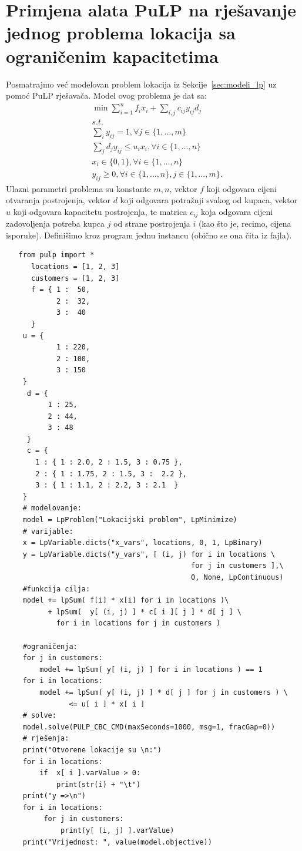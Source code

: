 \documentclass[a4paper, utf8, 11pt, colorlinks]{book}
\begin{document}
 \section{Primjena alata PuLP na rješavanje jednog problema lokacija sa ograničenim kapacitetima}%
 Posmatrajmo već modelovan problem lokacija iz Sekcije~\ref{sec:modeli_lp} uz pomoć PuLP rješavača. Model ovog problema je dat sa:
 \begin{align*}
 	   & \min \sum_{i=1}^n f_i x_i  + \sum_{i,j} c_{ij} y_{ij} d_j  \\
 	   &s.t. \nonumber \\
 	   & \sum_{i} y_{ij} = 1, \forall j\in\{1,\ldots,m\} \\
 	   & \sum_{j} d_j y_{ij} \leq u_i x_i, \forall i \in \{1,\ldots,n\} \\
 	   & x_i \in \{0, 1\}, \forall i \in \{1, \ldots, n\} \\
 	   & y_{ij} \geq 0, \forall i \in \{1,\ldots,n \}, j \in \{1, \ldots, m\}.
 \end{align*}
 Ulazni parametri problema su konstante $m, n$, vektor $f$ koji odgovara cijeni otvaranja postrojenja, vektor $d$ koji odgovara potražnji svakog od kupaca, vektor $u$ koji odgovara kapacitetu postrojenja, te matrica $c_{ij}$ koja 
 odgovara cijeni zadovoljenja potreba kupca $j$ od strane postrojenja $i$ (kao što je, recimo, cijena isporuke).  Definišimo kroz program jednu instancu (obično se ona čita iz fajla). 
 \begin{verbatim}
   from pulp import *
 	  locations = [1, 2, 3]
 	  customers = [1, 2, 3]
 	  f = { 1 :  50,
 	        2 :  32,
 	        3 :  40 
 	  }
    u = {
            1 : 220,
            2 : 100,
            3 : 150
    }
     d = {
          1 : 25,
          2 : 44,
          3 : 48
     }
     c = {
       1 : { 1 : 2.0, 2 : 1.5, 3 : 0.75 },
       2 : { 1 : 1.75, 2 : 1.5, 3 :  2.2 },  
       3 : { 1 : 1.1, 2 : 2.2, 3 : 2.1  }
    }
    # modelovanje:
    model = LpProblem("Lokacijski problem", LpMinimize) 
    # varijable:
    x = LpVariable.dicts("x_vars", locations, 0, 1, LpBinary)
    y = LpVariable.dicts("y_vars", [ (i, j) for i in locations \ 
                                            for j in customers ],\  
                                            0, None, LpContinuous)
    #funkcija cilja: 
    model += lpSum( f[i] * x[i] for i in locations )\ 
          + lpSum(  y[ (i, j) ] * c[ i ][ j ] * d[ j ] \ 
            for i in locations for j in customers )
   
    #ograničenja:
    for j in customers:
        model += lpSum( y[ (i, j) ] for i in locations ) == 1
    for i in locations: 
        model += lpSum( y[ (i, j) ] * d[ j ] for j in customers ) \ 
               <= u[ i ] * x[ i ]
    # solve:
    model.solve(PULP_CBC_CMD(maxSeconds=1000, msg=1, fracGap=0))
    # rješenja:
    print("Otvorene lokacije su \n:")
    for i in locations:
        if  x[ i ].varValue > 0:
            print(str(i) + "\t")
    print("y =>\n")
    for i in locations:
         for j in customers:
             print(y[ (i, j) ].varValue)
    print("Vrijednost: ", value(model.objective))    
 \end{verbatim}
\end{document}
